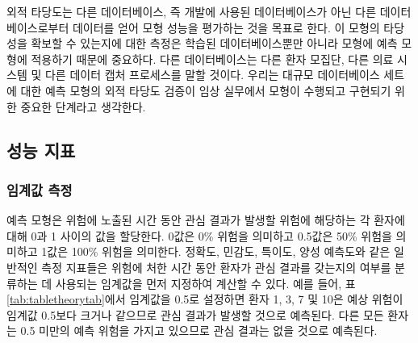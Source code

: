 \documentclass[11pt]{book}
\theoremstyle{definition}
\theoremstyle{definition}
\theoremstyle{definition}
\theoremstyle{remark}
\begin{document}
외적 타당도는 다른 데이터베이스, 즉 개발에 사용된 데이터베이스가 아닌
다른 데이터베이스로부터 데이터를 얻어 모형 성능을 평가하는 것을 목표로
한다. 이 모형의 타당성을 확보할 수 있는지에 대한 측정은 학습된
데이터베이스뿐만 아니라 모형에 예측 모형에 적용하기 때문에 중요하다.
다른 데이터베이스는 다른 환자 모집단, 다른 의료 시스템 및 다른 데이터
캡처 프로세스를 말할 것이다. 우리는 대규모 데이터베이스 세트에 대한 예측
모형의 외적 타당도 검증이 임상 실무에서 모형이 수행되고 구현되기 위한
중요한 단계라고 생각한다.

\subsection{성능 지표}\label{performance}

\subsubsection*{임계값 측정}\label{-}

예측 모형은 위험에 노출된 시간 동안 관심 결과가 발생할 위험에 해당하는
각 환자에 대해 0과 1 사이의 값을 할당한다. 0값은 0\% 위험을 의미하고
0.5값은 50\% 위험을 의미하고 1값은 100\% 위험을 의미한다. 정확도,
민감도, 특이도, 양성 예측도와 같은 일반적인 측정 지표들은 위험에 처한
시간 동안 환자가 관심 결과를 갖는지의 여부를 분류하는 데 사용되는
임계값을 먼저 지정하여 계산할 수 있다. 예를 들어, 표
\ref{tab:tabletheorytab}에서 임계값을 0.5로 설정하면 환자 1, 3, 7 및
10은 예상 위험이 임계값 0.5보다 크거나 같으므로 관심 결과가 발생할
것으로 예측된다. 다른 모든 환자는 0.5 미만의 예측 위험을 가지고 있으므로
관심 결과는 없을 것으로 예측된다. 
  
\end{document}

